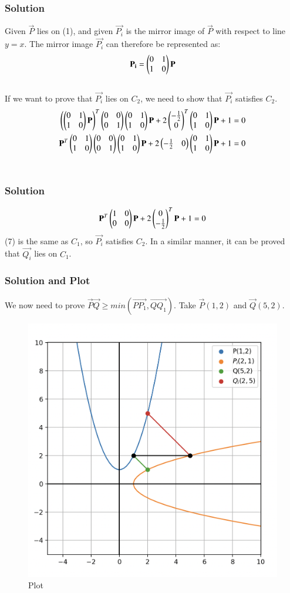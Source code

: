 \documentclass{beamer}
\begin{document}
\begin{frame}[fragile]
    \frametitle{Solution}
Given $\vec{P}$ lies on (1), and given $\vec{P_i}$ is the mirror image of $\vec{P}$ with respect to line $y=x$. The mirror image $\vec{P_i}$ can therefore be represented as:
\begin{align} \mathbf{P_i} = \begin{pmatrix}0&1\\1&0\end{pmatrix}\mathbf{P} \end{align}\\
If we want to prove that $\vec{P_i}$ lies on $C_2$, we need to show that $\vec{P_i}$ satisfies $C_2$.
\begin{align}
\left(\begin{pmatrix}0&1\\1&0\end{pmatrix}\mathbf{P}\right)^T\begin{pmatrix}0&0\\0&1\end{pmatrix}\begin{pmatrix}0&1\\1&0\end{pmatrix}\mathbf{P} + 2\begin{pmatrix}-\frac{1}{2}\\0\end{pmatrix}^T\begin{pmatrix}0&1\\1&0\end{pmatrix}\mathbf{P}+1 = 0\\
\mathbf{P}^T\begin{pmatrix}0&1\\1&0\end{pmatrix}\begin{pmatrix}0&0\\0&1\end{pmatrix}\begin{pmatrix}0&1\\1&0\end{pmatrix}\mathbf{P} + 2\begin{pmatrix}-\frac{1}{2}&0\end{pmatrix}\begin{pmatrix}0&1\\1&0\end{pmatrix}\mathbf{P}+1 = 0
\end{align}\\
\end{frame}

\begin{frame}[fragile]
    \frametitle{Solution}
\begin{align}
\mathbf{P}^T\begin{pmatrix}1&0\\0&0\end{pmatrix}\mathbf{P} + 2\begin{pmatrix}0\\-\frac{1}{2}\end{pmatrix}^T\mathbf{P}+1 = 0
\end{align}
(7) is the same as $C_1$, so $\vec{P_i}$ satisfies $C_2$. In a similar manner, it can be proved that $\vec{Q_i}$ lies on $C_1$.\vspace{1cm}\\
\end{frame}


\begin{frame}[fragile]
    \frametitle{Solution and Plot}
We now need to prove $\vec{P}\vec{Q} \geq min(\vec{PP_1}, \vec{QQ_1}).$ Take $\vec{P}(1,2)$ and $\vec{Q}(5,2)$.
\begin{figure}[H]
    \centering
    \includegraphics[width=0.5\columnwidth]{Figs/10753.png}
    \caption{Plot}
    \label{fig:placeholder}
\end{figure}
\end{frame}
\end{document}
